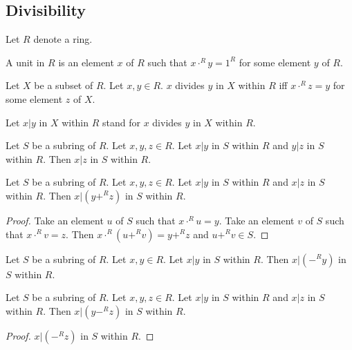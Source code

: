 \documentclass[english,11pt]{article}
\begin{document}
\subsection{Divisibility}

\begin{forthel}

Let $R$ denote a ring.

\begin{definition}
A unit in $R$ is an element $x$ of $R$ such that $x \cdot^{R} y = 1^{R}$
for some element $y$ of $R$. 
\end{definition}

\begin{definition} Let $X$ be a subset of $R$. Let $x,y \in R$. 
$x$ divides $y$ in $X$ within $R$ iff 
$x \cdot^{R} z = y$ for some element $z$ of $X$.
\end{definition}

Let $x | y$ in $X$ within $R$ stand for $x$ divides $y$ in $X$ within $R$.

\begin{lemma} Let $S$ be a subring of $R$.
Let $x,y,z \in R$. Let $x | y$ in $S$ within $R$ and $y | z$ in $S$ within $R$.
Then $x | z$ in $S$ within $R$.
\end{lemma}

\begin{lemma} Let $S$ be a subring of $R$.
Let $x,y,z \in R$. Let $x | y$ in $S$ within $R$ and $x | z$ in $S$ within $R$.
Then $x | (y +^{R} z)$ in $S$ within $R$.
\end{lemma}
\begin{proof}
Take an element $u$ of $S$ such that $x \cdot^{R} u = y$.
Take an element $v$ of $S$ such that $x \cdot^{R} v = z$.
Then $x \cdot^{R} (u +^{R} v) = y +^{R} z$ and $u +^{R} v \in S$. 
\end{proof}

\begin{lemma} Let $S$ be a subring of $R$.
Let $x,y\in R$. Let $x | y$ in $S$ within $R$.
Then $x | (-^{R} y)$ in $S$ within $R$.
\end{lemma}

\begin{lemma} Let $S$ be a subring of $R$.
Let $x,y,z \in R$. Let $x | y$ in $S$ within $R$ and $x | z$ in $S$ within $R$.
Then $x | (y -^{R} z)$ in $S$ within $R$.
\end{lemma}
\begin{proof}
$x | (-^{R} z)$ in $S$ within $R$.
\end{proof}

\end{forthel}
\end{document}
